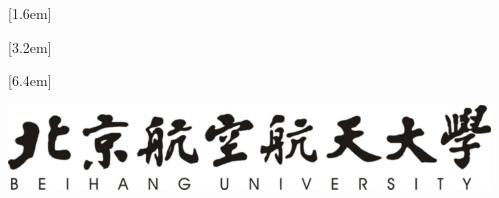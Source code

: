 \documentclass[zihao=-4]{ctexart}
\begin{document}
[1.6em]{\addvspace{2pt}\filright}
{\contentspush{\thecontentslabel\hspace{0.8em}}}
{}{\contentspage}

[3.2em]{\addvspace{2pt}\filright}
{\contentspush{\thecontentslabel\hspace{0.8em}}}
{}{\contentspage}

[6.4em]{\addvspace{2pt}\filright}
{\contentspush{\thecontentslabel\hspace{0.8em}}}
{}{\contentspage}


\linespread{1.8}
\setlength{\parskip}{0.5\baselineskip}


%
%
\def\Fengru{第三十四届“冯如杯”竞赛创意赛道}
\vspace{32pt}
\begin{center}
\includegraphics[height=2.25cm, width=12.78cm, scale=1]{include_picture/xiaoming.png}
\end{center}
\vspace{12pt}
\end{document}
